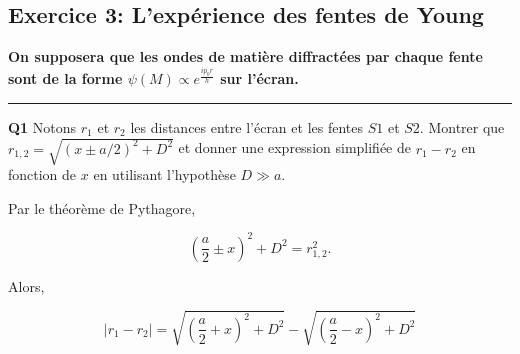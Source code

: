 \documentclass[french]{article}
\begin{document}
	\newpage
	
	\subsection*{Exercice 3: L'expérience des fentes de Young}
	\textbf{On supposera que les ondes de matière diffractées par chaque fente sont de la forme $\psi(M) \propto e^{\frac{ip_0r}{h}}$ sur l'écran.
	}
	\vspace{.3cm}
	\hrule
	\vspace{.3cm}
	{%
		
		\begin{tcolorbox}[colback=gray!5!white,colframe=gray!75!black]
			\textbf{\large{Q1}} Notons $r_1$ et $r_2$ les distances entre l'écran et les fentes $S1$ et $S2$. Montrer que $r_{1,2} = \sqrt{(x \pm a/2)^2 + D^2}$ et donner une expression simplifiée de $r_1 - r_2$ en fonction de $x$ en utilisant l'hypothèse $D \gg a$.
		\end{tcolorbox}
	
		Par le théorème de Pythagore,
		
		\begin{equation}
			\left( \frac{a}{2} \pm x \right)^2 + D^2 = r_{1,2}^2.
		\end{equation}
		
		Alors,
		
		\begin{equation}
			|r_1 - r_2| = \sqrt{\left(\frac{a}{2} + x\right)^2 + D^2} - \sqrt{\left(\frac{a}{2} - x\right)^2 + D^2} 
		\end{equation}
	
		
	}
	
\end{document}
